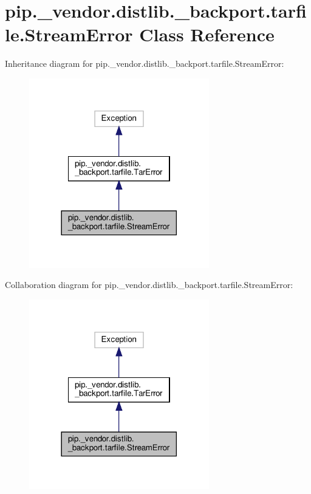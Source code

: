 \hypertarget{classpip_1_1__vendor_1_1distlib_1_1__backport_1_1tarfile_1_1StreamError}{}\section{pip.\+\_\+vendor.\+distlib.\+\_\+backport.\+tarfile.\+Stream\+Error Class Reference}
\label{classpip_1_1__vendor_1_1distlib_1_1__backport_1_1tarfile_1_1StreamError}


Inheritance diagram for pip.\+\_\+vendor.\+distlib.\+\_\+backport.\+tarfile.\+Stream\+Error\+:
\nopagebreak
\begin{figure}[H]
\begin{center}
\leavevmode
\includegraphics[width=222pt]{classpip_1_1__vendor_1_1distlib_1_1__backport_1_1tarfile_1_1StreamError__inherit__graph}
\end{center}
\end{figure}


Collaboration diagram for pip.\+\_\+vendor.\+distlib.\+\_\+backport.\+tarfile.\+Stream\+Error\+:
\nopagebreak
\begin{figure}[H]
\begin{center}
\leavevmode
\includegraphics[width=222pt]{classpip_1_1__vendor_1_1distlib_1_1__backport_1_1tarfile_1_1StreamError__coll__graph}
\end{center}
\end{figure}


